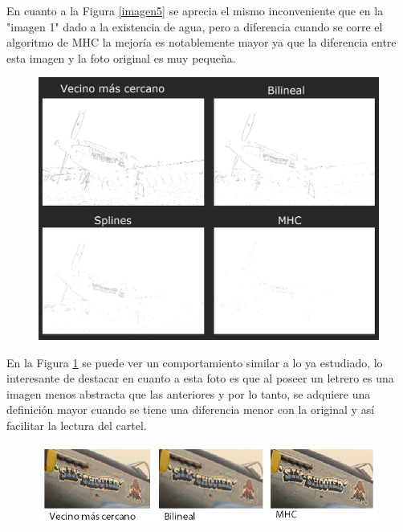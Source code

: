 \documentclass[a4paper]{article}
\begin{document}
En cuanto a la Figura \ref{imagen5} se aprecia el mismo inconveniente que en la "imagen 1" dado a la existencia de agua, pero a diferencia cuando se corre el algoritmo de MHC la mejor\'ia es notablemente mayor ya que la diferencia entre esta imagen y la foto original es muy peque\~na.\\

\newpage


\begin{figure}[h!]
	\caption{}
	\begin{center}
	\includegraphics[scale=0.40]{imagenes/comparacion/09/collage}
	\label{imagen9}
  \end{center}
\end{figure}

En la Figura \ref{imagen9} se puede ver un comportamiento similar a lo ya estudiado, lo interesante de destacar en cuanto a esta foto es que al poseer un letrero es una imagen menos abstracta que las anteriores y por lo tanto, se adquiere una definici\'on mayor cuando se tiene una diferencia menor con la original y as\'i facilitar la lectura del cartel.


\begin{figure}[h!]
	\caption{}
	\begin{center}
	\includegraphics[scale=0.05]{imagenes/comparacion/cartel}
	\label{cartel}
  \end{center}
\end{figure}
\end{document}
